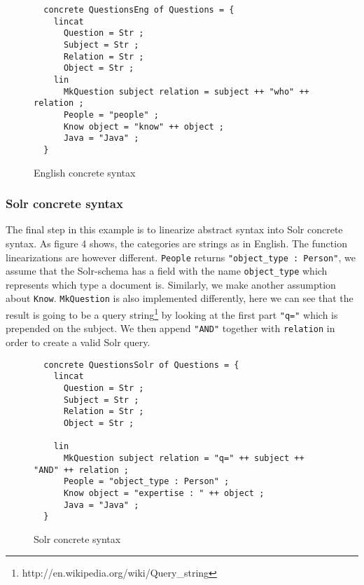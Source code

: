 \newenvironment{myfont}{\myfont}{\par}

\begin{figure}[h]
\begin{verbatim}
  concrete QuestionsEng of Questions = {
    lincat
      Question = Str ;
      Subject = Str ;
      Relation = Str ;
      Object = Str ;
    lin
      MkQuestion subject relation = subject ++ "who" ++ relation ;
      People = "people" ;
      Know object = "know" ++ object ;
      Java = "Java" ;
  }
\end{verbatim}
\caption{English concrete syntax}
\end{figure}

\subsubsection*{Solr concrete syntax}

The final step in this example is to linearize abstract syntax into Solr concrete syntax.
  As figure 4 shows, the categories are strings as in English. The function linearizations are however
  different. \texttt{People} returns 
  \texttt{"object\_type : Person"}, we assume that 
  the Solr-schema has a field with the name \texttt{object\_type} which represents 
  which type a document is. Similarly, we make another assumption about \texttt{Know}. \texttt{MkQuestion} is also implemented differently, here we can see that the result is going to be a query string\footnote{http://en.wikipedia.org/wiki/Query\_string} by looking at the first part \texttt{"q="} which is prepended on the subject. We then append \texttt{"AND"} together with \texttt{relation} in order to create a valid Solr query.

\begin{figure}[h]
\begin{verbatim}
  concrete QuestionsSolr of Questions = {
    lincat
      Question = Str ;
      Subject = Str ;
      Relation = Str ;
      Object = Str ;

    lin
      MkQuestion subject relation = "q=" ++ subject ++ "AND" ++ relation ;
      People = "object_type : Person" ;
      Know object = "expertise : " ++ object ;
      Java = "Java" ;
  }
\end{verbatim}
\caption{Solr concrete syntax}
\end{figure}

